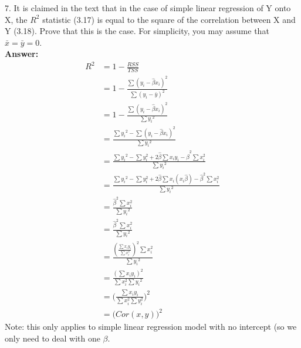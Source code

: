 \documentclass[12pt]{article}
\begin{document}
7. It is claimed in the text that in the case of simple linear regression of Y onto X, the $R^2$ statistic (3.17) is equal to the square of the correlation between X and Y (3.18). Prove that this is the case. For simplicity, you may assume that $\bar{x}=\bar{y}=0$. \\
\textbf{Answer:}\\
\begin{align*}
R^2&=1-\frac{RSS}{TSS}\\
&=1-\frac{\sum{(y_i-\hat{\beta}x_i)^2}}{\sum {(y_i-\bar{y})}^2}\\
&=1-\frac{\sum{(y_i-\hat{\beta}x_i)^2}}{\sum {y_i}^2}\\
&=\frac{\sum {y_i}^2-\sum{(y_i-\hat{\beta}x_i)^2}}{\sum {y_i}^2}\\
&=\frac{\sum {y_i}^2-\sum{y_i^2}+2\hat{\beta}\sum{x_i y_i}-\hat{\beta}^2 \sum{x_i^2}}{\sum {y_i}^2}\\
&=\frac{\sum {y_i}^2-\sum{y_i^2}+2\hat{\beta}\sum{x_i (x_i \hat{\beta})}-\hat{\beta}^2 \sum{x_i^2}}{\sum {y_i}^2}\\
&=\frac{\hat{\beta}^2 \sum{x_i^2}}{\sum {y_i}^2}\\
&=\frac{\hat{\beta}^2 \sum{x_i^2}}{\sum {y_i}^2}\\
&=\frac{(\frac{\sum x_i y_i}{\sum x_i^2})^2 \sum{x_i^2}}{\sum {y_i}^2}\\
&=\frac{(\sum x_i y_i)^2 }{\sum{x_i^2} \sum {y_i}^2}\\
&=\Big( \frac{\sum x_i y_i}{\sum x_i^2 \sum y_i^2}\Big)^2\\
&=\Big( Cor(x,y) \Big)^2
\end{align*}
Note: this only applies to simple linear regression model with no intercept (so we only need to deal with one $\beta$. \\
\end{document}
